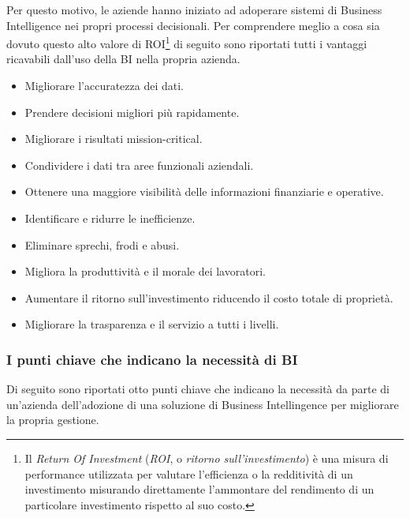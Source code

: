 Per questo motivo, le aziende hanno iniziato ad adoperare sistemi di Business Intelligence nei propri processi decisionali. Per comprendere meglio a cosa sia dovuto questo alto valore di ROI\footnote{Il \textit{Return Of Investment} (\textit{ROI}, o \textit{ritorno sull'investimento}) è una misura di performance utilizzata per valutare l'efficienza o la redditività di un investimento misurando direttamente l'ammontare del rendimento di un particolare investimento rispetto al suo costo.\cite{investopedia_roi}} di seguito sono riportati tutti i vantaggi ricavabili dall'uso della BI nella propria azienda.\cite{oracle_business_intelligence}

\begin{itemize}
    \item Migliorare l'accuratezza dei dati.
    \item Prendere decisioni migliori più rapidamente.
    \item Migliorare i risultati mission-critical.
    \item Condividere i dati tra aree funzionali aziendali.
    \item Ottenere una maggiore visibilità delle informazioni finanziarie e operative.
    \item Identificare e ridurre le inefficienze.
    \item Eliminare sprechi, frodi e abusi.
    \item Migliora la produttività e il morale dei lavoratori.
    \item Aumentare il ritorno sull'investimento riducendo il costo totale di proprietà.
    \item Migliorare la trasparenza e il servizio a tutti i livelli.
\end{itemize}

\subsubsection{I punti chiave che indicano la necessità di BI}

Di seguito sono riportati otto punti chiave che indicano la necessità da parte di un'azienda dell'adozione di una soluzione di Business Intellingence per migliorare la propria gestione.\cite{boomper_book_of_bi}

